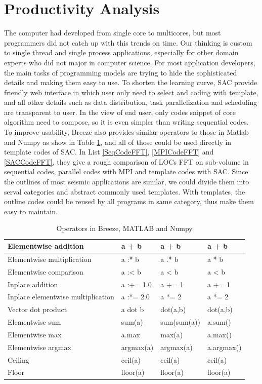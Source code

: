 \section{Productivity Analysis}
The computer had developed from single core to multicores, but most programmers did not catch up with this trends on time. Our thinking is custom to single thread and single process applications, especially for other domain experts who did not major in computer science. For most application developers, the main tasks of programming models are trying to hide the sophisticated details and making them easy to use. To shorten the learning curve, SAC provide friendly web interface in which user only need to select and coding with template, and all other details such as data distribution, task parallelization and scheduling are transparent to user. In the view of end user, only codes snippet of core algorithm need to compose, so it is even simpler than writing sequential codes. To improve usability, Breeze also provides similar operators to those in Matlab and Numpy as show in Table \ref{tab:BreezeOperators}, and all of those could be used directly in template codes of SAC. In List \ref{SeqCodeFFT}, \ref{MPICodeFFT} and \ref{SACCodeFFT}, they give a rough comparison of LOCs FFT on sub-volume in sequential codes, parallel codes with MPI and template codes with SAC. Since the outlines of most seismic applications are similar, we could divide them into serval categories and abstract commonly used templates. With templates, the outline codes could be reused by all programs in same category, thus make them easy to maintain.   


\begin{table}[h]
\centering
\caption{Operators in Breeze, MATLAB and Numpy}
\begin{tabular}{||l|l|l|l||}
\hline
Elementwise addition & a + b & a + b & a + b \\
\hline
Elementwise multiplication & a :* b & a .* b & a * b \\
\hline
Elementwise comparison & a :\textless{}  b & a \textless{}  b & a \textless{}  b \\
\hline
Inplace addition & a :+= 1.0 & a += 1 & a += 1 \\
\hline
Inplace elementwise multiplication & a :*= 2.0 & a *= 2 & a *= 2 \\
\hline
Vector dot product & a dot b & dot(a,b)	& dot(a,b) \\
\hline
Elementwise sum	& sum(a) & sum(sum(a)) & a.sum() \\
\hline
Elementwise max & a.max & max(a) & a.max() \\
\hline
Elementwise argmax & argmax(a) & argmax(a) & a.argmax() \\
\hline
Ceiling	& ceil(a) & ceil(a) & ceil(a) \\
\hline
Floor	& floor(a) & floor(a) & floor(a) \\
\hline
\end{tabular}
\label{tab:BreezeOperators}
\end{table}

